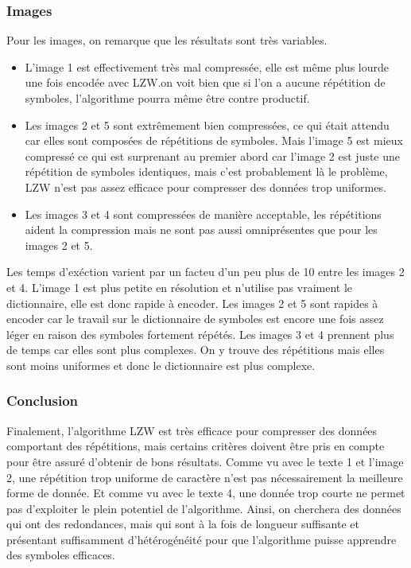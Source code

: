\documentclass{article}[letterpaper, 11pt]
\begin{document}
\subsubsection{Images}
Pour les images, on remarque que les résultats sont très variables.
\begin{itemize}[label={--}]
	\item L'image 1 est effectivement très mal compressée, elle est même plus lourde une fois encodée avec LZW.\@Ainsi on voit bien que si l'on a aucune répétition de symboles, l'algorithme pourra même être contre productif.
	\item Les images 2 et 5 sont extrêmement bien compressées, ce qui était attendu car elles sont composées de répétitions de symboles. Mais l'image 5 est mieux compressé ce qui est surprenant au premier abord car l'image 2 est juste une répétition de symboles identiques, mais c'est probablement là le problème, LZW n'est pas assez efficace pour compresser des données trop uniformes.
	\item Les images 3 et 4 sont compressées de manière acceptable, les répétitions aident la compression mais ne sont pas aussi omniprésentes que pour les images 2 et 5.
\end{itemize}

Les temps d'exéction varient par un facteu d'un peu plus de 10 entre les images 2 et 4. L'image 1 est plus petite en résolution et n'utilise pas vraiment le dictionnaire, elle est donc rapide à encoder. Les images 2 et 5 sont rapides à encoder car le travail sur le dictionnaire de symboles est encore une fois assez léger en raison des symboles fortement répétés. Les images 3 et 4 prennent plus de temps car elles sont plus complexes. On y trouve des répétitions mais elles sont moins uniformes et donc le dictionnaire est plus complexe.
\subsubsection{Conclusion}
Finalement, l'algorithme LZW est très efficace pour compresser des données comportant des répétitions, mais certains critères doivent être pris en compte pour être assuré d'obtenir de bons résultats. Comme vu avec le texte 1 et l'image 2, une répétition trop uniforme de caractère n'est pas nécessairement la meilleure forme de donnée. Et comme vu avec le texte 4, une donnée trop courte ne permet pas d'exploiter le plein potentiel de l'algorithme. Ainsi, on cherchera des données qui ont des redondances, mais qui sont à la fois de longueur suffisante et présentant suffisamment d'hétérogénéité pour que l'algorithme puisse apprendre des symboles efficaces.
\newpage
\end{document}
